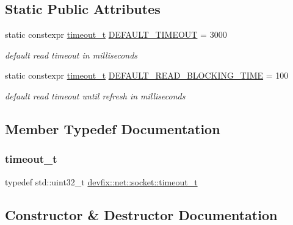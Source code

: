 \subsection*{Static Public Attributes}
\begin{DoxyCompactItemize}
\item 
static constexpr \hyperlink{structdevfix_1_1net_1_1socket_a80a3bf4cb7292bae31ea9c6575539c68}{timeout\+\_\+t} \hyperlink{structdevfix_1_1net_1_1socket_a1bd6468be497aed208ad6d5632683a5d}{D\+E\+F\+A\+U\+L\+T\+\_\+\+T\+I\+M\+E\+O\+UT} = 3000
\begin{DoxyCompactList}\small\item\em default read timeout in milliseconds \end{DoxyCompactList}\item 
static constexpr \hyperlink{structdevfix_1_1net_1_1socket_a80a3bf4cb7292bae31ea9c6575539c68}{timeout\+\_\+t} \hyperlink{structdevfix_1_1net_1_1socket_a77c3214eb436d06825a4cc2aafcc63ce}{D\+E\+F\+A\+U\+L\+T\+\_\+\+R\+E\+A\+D\+\_\+\+B\+L\+O\+C\+K\+I\+N\+G\+\_\+\+T\+I\+ME} = 100
\begin{DoxyCompactList}\small\item\em default read timeout until refresh in milliseconds \end{DoxyCompactList}\end{DoxyCompactItemize}


\subsection{Member Typedef Documentation}
\mbox{\label{structdevfix_1_1net_1_1socket_a80a3bf4cb7292bae31ea9c6575539c68}} 
\subsubsection{\texorpdfstring{timeout\+\_\+t}{timeout\_t}}
{\footnotesize\ttfamily typedef std\+::uint32\+\_\+t \hyperlink{structdevfix_1_1net_1_1socket_a80a3bf4cb7292bae31ea9c6575539c68}{devfix\+::net\+::socket\+::timeout\+\_\+t}}



\subsection{Constructor \& Destructor Documentation}
\mbox{\label{structdevfix_1_1net_1_1socket_ad9d4d9643894e213faefd4e37938f1fe}} 
